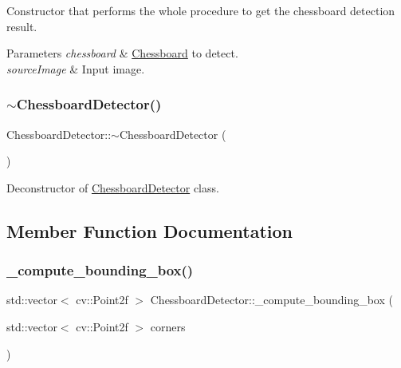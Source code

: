 Constructor that performs the whole procedure to get the chessboard detection result. 


\begin{DoxyParams}{Parameters}
{\em chessboard} & \hyperlink{class_chessboard}{Chessboard} to detect. \\
\hline
{\em source\+Image} & Input image. \\
\hline
\end{DoxyParams}
\mbox{\label{class_chessboard_detector_a7db4aa40348c01899ac8be7a959d1f77}} 
\subsubsection{\texorpdfstring{$\sim$\+Chessboard\+Detector()}{~ChessboardDetector()}}
{\footnotesize\ttfamily Chessboard\+Detector\+::$\sim$\+Chessboard\+Detector (\begin{DoxyParamCaption}{ }\end{DoxyParamCaption})\hspace{0.3cm}{\ttfamily [inline]}}



Deconstructor of \hyperlink{class_chessboard_detector}{Chessboard\+Detector} class. 



\subsection{Member Function Documentation}
\mbox{\label{class_chessboard_detector_af5ce25d1aa585ee9b48e705ddd9c0da1}} 
\subsubsection{\texorpdfstring{\+\_\+compute\+\_\+bounding\+\_\+box()}{\_compute\_bounding\_box()}}
{\footnotesize\ttfamily std\+::vector$<$ cv\+::\+Point2f $>$ Chessboard\+Detector\+::\+\_\+compute\+\_\+bounding\+\_\+box (\begin{DoxyParamCaption}\item[{std\+::vector$<$ cv\+::\+Point2f $>$}]{corners }\end{DoxyParamCaption})\hspace{0.3cm}{\ttfamily [private]}}




